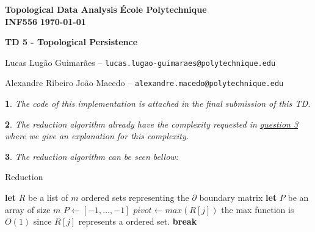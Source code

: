 \documentclass[10pt]{article} %
\theoremstyle{problemstyle}
\newtheorem{question}{\arabic{question}}
\begin{document}
\noindent
\normalsize\textbf{Topological Data Analysis} \hfill \textbf{École Polytechnique}\\
\normalsize\textbf{INF556} \hfill \textbf{\today}\vspace{10pt}
\centerline{\Large }\vspace{5pt}
\centerline{\Large \textbf{TD 5 - Topological Persistence}}\vspace{8pt}
\centerline{Lucas Lugão Guimarães -- \texttt{lucas.lugao-guimaraes@polytechnique.edu}  }
\centerline{Alexandre Ribeiro João Macedo --  \texttt{alexandre.macedo@polytechnique.edu}}
\vspace{20pt}

\begin{question} %
The code of this implementation is attached in the final submission of this TD.
\end{question}

\begin{question} %
The reduction algorithm already have the complexity requested in \hyperref[q:3]{question \ref*{q:3}} where we give an explanation for this complexity.
\end{question}

\begin{question} %
\label{q:3}
The reduction algorithm can be seen bellow:
\end{question}

\begin{algorithm}
\caption{Reduction}
\begin{algorithmic}[1]
\State \textbf{let} $ R $ be a list of $m$ ordered sets representing the $\partial$ boundary matrix
\State \textbf{let} $P$ be an array of size $m$
\State $P \gets [-1,\dots,-1]$
		\State $pivot \gets max(R[j])$ {\hfill \color{comment} the max function is $O(1)$ since $R[j]$ represents a ordered set.}
		\Else
			\State \textbf{break}
		\EndIf
	\EndWhile
	\EndIf
\EndFor
\end{algorithmic}
\end{algorithm}
\end{document}
